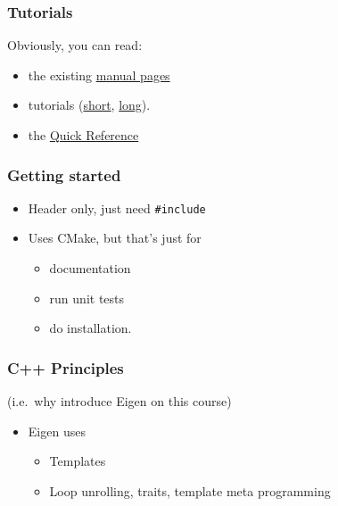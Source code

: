 \subsubsection{Tutorials}\label{tutorials-1}

Obviously, you can read:

\begin{itemize}
\itemsep1pt\parskip0pt
\item
  the existing \href{http://eigen.tuxfamily.org/dox/index.html}{manual
  pages}
\item
  tutorials
  (\href{http://eigen.tuxfamily.org/dox/GettingStarted.html}{short},
  \href{http://eigen.tuxfamily.org/dox/group__TutorialMatrixClass.html}{long}).
\item
  the
  \href{http://eigen.tuxfamily.org/dox/group__QuickRefPage.html}{Quick
  Reference}
\end{itemize}

\subsubsection{Getting started}\label{getting-started}

\begin{itemize}
\itemsep1pt\parskip0pt
\item
  Header only, just need \texttt{\#include}
\item
  Uses CMake, but that's just for

  \begin{itemize}
  \itemsep1pt\parskip0pt
  \item
    documentation
  \item
    run unit tests
  \item
    do installation.
  \end{itemize}
\end{itemize}

\subsubsection{C++ Principles}\label{c-principles}

(i.e.~why introduce Eigen on this course)

\begin{itemize}
\itemsep1pt\parskip0pt
\item
  Eigen uses

  \begin{itemize}
  \itemsep1pt\parskip0pt
  \item
    Templates
  \item
    Loop unrolling, traits, template meta programming
  \end{itemize}
\end{itemize}

